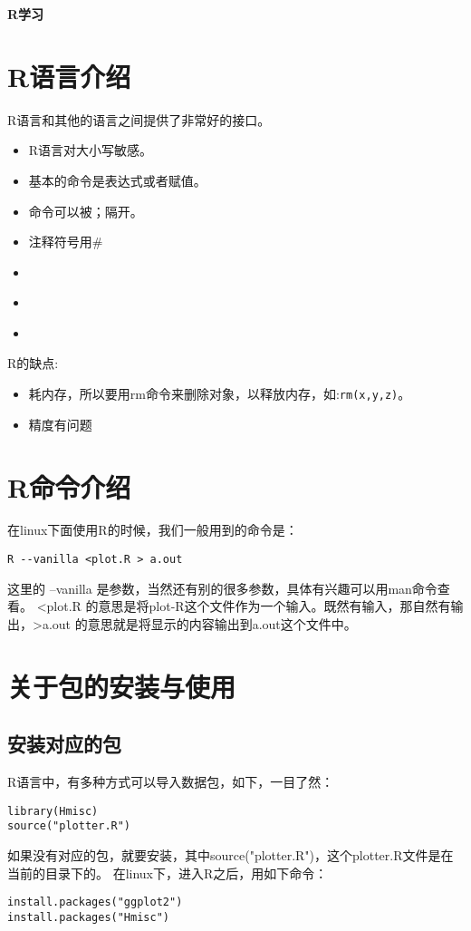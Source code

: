 \documentclass[a4paper,12pt]{ctexart}
\begin{document}
\begin{center}
\huge \textbf{R学习}
\end{center}

\tableofcontents
\newpage

\section{R语言介绍}
R语言和其他的语言之间提供了非常好的接口。
\begin{itemize}
  \item R语言对大小写敏感。
  \item 基本的命令是表达式或者赋值。
  \item 命令可以被；隔开。
  \item 注释符号用\#
  \item 
  \item 
  \item 
\end{itemize}

R的缺点:
\begin{itemize}
  \item 耗内存，所以要用rm命令来删除对象，以释放内存，如:\verb|rm(x,y,z)|。
  \item 精度有问题
\end{itemize}

\section{R命令介绍}
在linux下面使用R的时候，我们一般用到的命令是：
\begin{verbatim}
R --vanilla <plot.R > a.out
\end{verbatim}
这里的 --vanilla 是参数，当然还有别的很多参数，具体有兴趣可以用man命令查看。
<plot.R 的意思是将plot-R这个文件作为一个输入。既然有输入，那自然有输出，>a.out 的意思就是将显示的内容输出到a.out这个文件中。

\section{关于包的安装与使用}
\subsection{安装对应的包}
R语言中，有多种方式可以导入数据包，如下，一目了然：
\begin{verbatim}
library(Hmisc)
source("plotter.R")
\end{verbatim}
如果没有对应的包，就要安装，其中source("plotter.R")，这个plotter.R文件是在当前的目录下的。
在linux下，进入R之后，用如下命令：
\begin{verbatim}
install.packages("ggplot2")
install.packages("Hmisc")
\end{verbatim}
\end{document}
